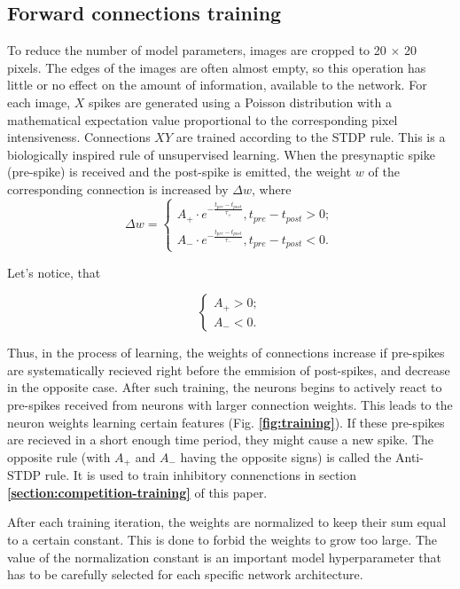 \documentclass[a4paper,10pt]{article}
\newcommand{\refbf}[1]{\textbf{\ref{#1}}}
\begin{document}
\subsection{Forward connections training}
To reduce the number of model parameters, images are cropped to 20 $\times$ 20 pixels. The edges of the images are often almost empty, so this operation has little or no effect on the amount of information, available to the network. For each image, $X$ spikes are generated using a Poisson distribution with a mathematical expectation value  proportional to the corresponding pixel intensiveness. Connections $XY$ are trained according to the STDP \parencite{STDP} rule. This is a biologically inspired rule of unsupervised learning. When the presynaptic spike (pre-spike) is received and the post-spike is emitted, the weight $w$ of the corresponding connection is increased by $ \Delta w $, where
\begin{equation} 
\Delta w =
 \begin{cases}
 A_+ \cdot e^{- \frac{t_{pre} - t_{post}}{\tau_+}}, t_{pre} - t_{post} > 0;\\
 A_- \cdot e^{- \frac{t_{pre} - t_{post}}{\tau_-}}, t_{pre} - t_{post} < 0.
 \end{cases}
\end{equation}

Let's notice, that

$$
\begin{cases}
 A_{+} > 0;\\
 A_{-} < 0.
\end{cases}
$$

Thus, in the process of learning, the weights of connections increase if pre-spikes are systematically recieved right before the emmision of post-spikes, and decrease in the opposite case. After such training, the neurons begins to actively react to pre-spikes received from neurons with larger connection weights. This leads to the neuron weights learning certain features (Fig. \refbf{fig:training}). If these pre-spikes are recieved in a short enough time period, they might cause a new spike. The opposite rule (with $A_{+}$ and $A_{-}$ having the opposite signs) is called the Anti-STDP \parencite{Anti-STDP} rule. It is used to train inhibitory connenctions in section \refbf{section:competition-training} of this paper.

After each training iteration, the weights are normalized to keep their sum equal to a certain constant. This is done to forbid the weights to grow too large. The value of the normalization constant is an important model hyperparameter that has to be carefully selected for each specific network architecture.
\end{document}
